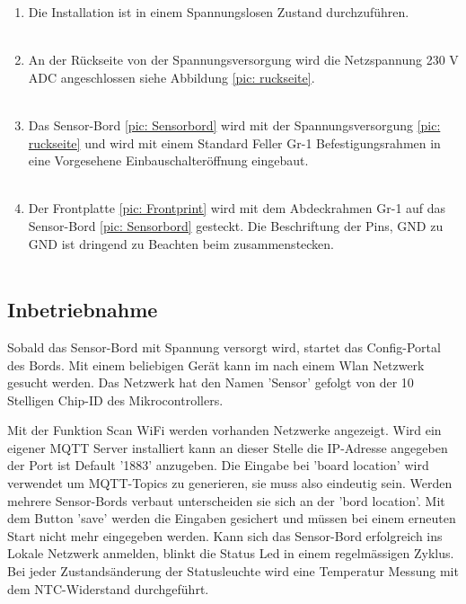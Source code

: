 \begin{enumerate}
	\item Die Installation ist in einem Spannungslosen Zustand durchzuführen.\\
	\\
	\item An der Rückseite von der Spannungsversorgung wird die Netzspannung 230 V ADC angeschlossen siehe Abbildung \ref{pic: ruckseite}.\\
	\\
	\item Das Sensor-Bord \ref{pic: Sensorbord} wird mit der Spannungsversorgung \ref{pic: ruckseite} und wird mit einem Standard Feller Gr-1 Befestigungsrahmen in eine Vorgesehene Einbauschalteröffnung eingebaut. \\
	\\
	\item Der Frontplatte \ref{pic: Frontprint} wird mit dem Abdeckrahmen Gr-1 auf das Sensor-Bord \ref{pic: Sensorbord} gesteckt. Die Beschriftung der Pins, GND zu GND ist dringend zu Beachten beim zusammenstecken.\\
	\\
	\end{enumerate}

\subsection{Inbetriebnahme}
Sobald das Sensor-Bord mit Spannung versorgt wird, startet das Config-Portal des Bords. Mit einem beliebigen Gerät kann im nach einem Wlan Netzwerk gesucht werden. Das Netzwerk hat den Namen 'Sensor' gefolgt von der 10 Stelligen Chip-ID des Mikrocontrollers. 

Mit der Funktion Scan WiFi werden vorhanden Netzwerke angezeigt. Wird ein eigener MQTT Server installiert kann an dieser Stelle die IP-Adresse angegeben der Port ist Default '1883' anzugeben. Die Eingabe bei 'board location' wird verwendet um MQTT-Topics zu generieren, sie muss also eindeutig sein. Werden mehrere Sensor-Bords verbaut unterscheiden sie sich an der 'bord location'. Mit dem Button 'save' werden die Eingaben gesichert und müssen bei einem erneuten Start nicht mehr eingegeben werden. Kann sich das Sensor-Bord erfolgreich ins Lokale Netzwerk anmelden, blinkt die Status Led in einem regelmässigen Zyklus. Bei jeder Zustandsänderung der Statusleuchte wird eine Temperatur Messung mit dem NTC-Widerstand durchgeführt. 

